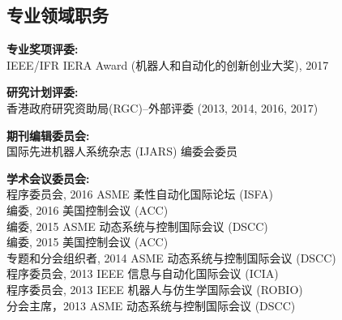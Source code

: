\documentclass[UTF8,nofonts]{res}
\begin{document}
\begin{resume}

\section{专业领域职务}
\vspace{0.1in}

    \textbf{专业奖项评委:}\\
    IEEE/IFR IERA Award (机器人和自动化的创新创业大奖), 2017
    
    \textbf{研究计划评委:}\\ %
    香港政府研究资助局(RGC)--外部评委 (2013, 2014, 2016, 2017)
 	
    \textbf{期刊编辑委员会:}\\ %
    国际先进机器人系统杂志 (IJARS) 编委会委员 

    \textbf{学术会议委员会:}\\ %
    程序委员会, 2016 ASME 柔性自动化国际论坛 (ISFA)\\
    编委, 2016 美国控制会议 (ACC)\\
    编委, 2015 ASME 动态系统与控制国际会议 (DSCC)\\
    编委, 2015 美国控制会议 (ACC)\\
    专题和分会组织者, 2014 ASME 动态系统与控制国际会议  (DSCC)\\
    程序委员会, 2013 IEEE 信息与自动化国际会议 (ICIA)\\
    程序委员会, 2013 IEEE 机器人与仿生学国际会议 (ROBIO)\\
    分会主席，2013 ASME 动态系统与控制国际会议 (DSCC)


\end{resume}
\end{document}
